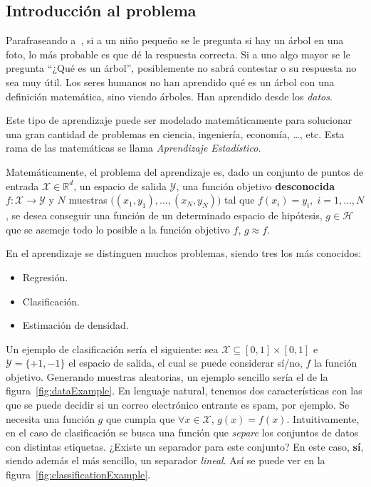 \documentclass[a4paper,11pt]{book}\usepackage[]{graphicx}\usepackage[]{color}
\theoremstyle{plain}
\theoremstyle{definition}
\begin{document}
\subsection{Introducción al problema}

Parafraseando a~\cite{Abu-Mostafa:2012:LD:2207825}, si a un niño pequeño se le pregunta si hay un árbol
en una foto, lo más probable es que dé la respuesta correcta. Si a uno algo mayor
se le pregunta ``¿Qué es un árbol'', posiblemente no sabrá contestar o su respuesta
no sea muy útil. Los seres humanos no han aprendido qué es un árbol con una definición
matemática, sino viendo árboles. Han aprendido desde los \emph{datos}.

Este tipo de aprendizaje puede ser modelado matemáticamente para solucionar una gran
cantidad de problemas en ciencia, ingeniería, economía, \ldots, etc. Esta rama de
las matemáticas se llama \emph{Aprendizaje Estadístico}.

Matemáticamente, el problema del aprendizaje es, dado un conjunto de puntos de entrada
$\mathcal{X} \in \mathbb{R}^d$, un espacio de salida $\mathcal{Y}$, una función objetivo
\textbf{desconocida}$f:\mathcal{X} \rightarrow \mathcal{Y}$ y $N$ muestras
$\big((x_1,y_1),\ldots,(x_N,y_N) \big)$
tal que $f(x_i) = y_i, \; i = 1,\ldots,N$,
se desea conseguir una función de un determinado espacio de hipótesis,
$g \in \mathcal{H}$ que se asemeje todo lo posible a la función objetivo
$f$, $g \approx f$.


En el aprendizaje se distinguen muchos problemas, siendo tres los más conocidos:
\begin{itemize}
  \item Regresión.
  \item Clasificación.
  \item Estimación de densidad.
\end{itemize}

Un ejemplo de clasificación sería el siguiente:
sea $\mathcal{X} \subseteq [0,1] \times [0,1]$ e $\mathcal{Y} = \{+1,-1\}$ el espacio
de salida, el cual se puede considerar sí/no, $f$ la función objetivo.
Generando muestras aleatorias, un ejemplo sencillo sería el de la
figura~\ref{fig:dataExample}. En lenguaje natural, tenemos dos características
con las que se puede decidir si un correo electrónico entrante es spam, por ejemplo.
Se necesita una función $g$ que cumpla que $\forall x \in \mathcal{X}$, $g(x) = f(x)$.
Intuitivamente, en el caso de clasificación se busca una función que \emph{separe}
los conjuntos de datos con distintas etiquetas. ¿Existe un separador para este conjunto?
En este caso, \textbf{sí}, siendo además el más sencillo, un separador \emph{lineal}.
Así se puede ver en la figura~\ref{fig:classificationExample}.
\end{document}
